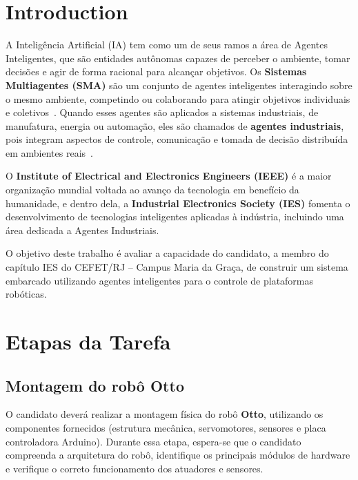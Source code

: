 \documentclass{ieeeojies}
\begin{document}
\maketitle

\section{Introduction}
\label{sec:introduction}
A Inteligência Artificial (IA) tem como um de seus ramos a área de Agentes Inteligentes, que são entidades autônomas capazes de perceber o ambiente, tomar decisões e agir de forma racional para alcançar objetivos. Os \textbf{Sistemas Multiagentes (SMA)} são um conjunto de agentes inteligentes interagindo sobre o mesmo ambiente, competindo ou colaborando para atingir objetivos individuais e coletivos~\cite{Wooldridge2009}. Quando esses agentes são aplicados a sistemas industriais, de manufatura, energia ou automação, eles são chamados de \textbf{agentes industriais}, pois integram aspectos de controle, comunicação e tomada de decisão distribuída em ambientes reais~\cite{LeitaoKarnouskos2016}.

O \textbf{Institute of Electrical and Electronics Engineers (IEEE)} é a maior organização mundial voltada ao avanço da tecnologia em benefício da humanidade, e dentro dela, a \textbf{Industrial Electronics Society (IES)} fomenta o desenvolvimento de tecnologias inteligentes aplicadas à indústria, incluindo uma área dedicada a Agentes Industriais.

O objetivo deste trabalho é avaliar a capacidade do candidato, a membro do capítulo IES do CEFET/RJ – Campus Maria da Graça, de construir um sistema embarcado utilizando agentes inteligentes para o controle de plataformas robóticas. 

\section{Etapas da Tarefa}

\subsection{Montagem do robô Otto}

O candidato deverá realizar a montagem física do robô \textbf{Otto}, utilizando os componentes fornecidos (estrutura mecânica, servomotores, sensores e placa controladora Arduino). Durante essa etapa, espera-se que o candidato compreenda a arquitetura do robô, identifique os principais módulos de hardware e verifique o correto funcionamento dos atuadores e sensores.
\end{document}

